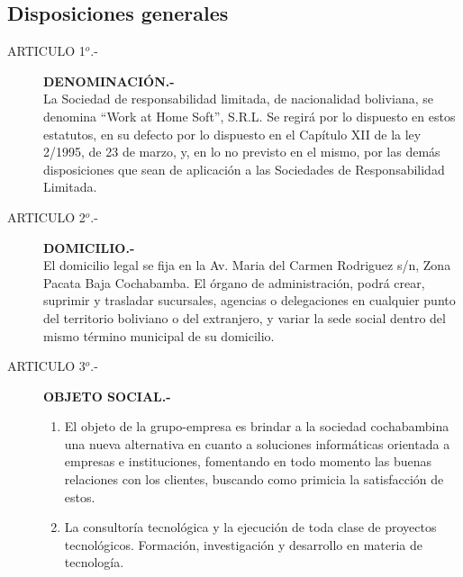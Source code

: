 \documentclass[11pt,letterpaper]{report}
\begin{document}
\subsection{ Disposiciones generales }

\begin{description}
\item[ARTICULO 1$^{o}$.-] {\bf DENOMINACI\'ON.-}\\ La Sociedad de responsabilidad limitada, de nacionalidad boliviana, se denomina “Work at Home Soft”, S.R.L. Se regir\'a por lo dispuesto en estos estatutos, en su defecto por lo dispuesto en el Cap\'itulo XII de la ley 2/1995, de 23 de marzo, y, en lo no previsto en el mismo, por las dem\'as disposiciones que sean de aplicaci\'on a las Sociedades de Responsabilidad Limitada.
\item[ARTICULO 2$^{o}$.-] {\bf DOMICILIO.-}\\ El domicilio legal se fija en la Av. Maria del Carmen Rodriguez s/n, Zona Pacata Baja Cochabamba.
El \'organo de administraci\'on, podr\'a crear, suprimir y trasladar sucursales, agencias o delegaciones en cualquier punto del territorio boliviano o del extranjero, y variar la sede social dentro del mismo t\'ermino municipal de su domicilio.
\item[ARTICULO 3$^{o}$.-] {\bf OBJETO SOCIAL.- }
\begin{enumerate}
\item El objeto de la grupo-empresa es brindar a la sociedad cochabambina una nueva alternativa en cuanto a soluciones inform\'aticas orientada a empresas e instituciones, fomentando en todo momento las buenas relaciones con los clientes, buscando como primicia la satisfacci\'on de estos.
\item La consultor\'ia tecnol\'ogica y la ejecuci\'on de toda clase de proyectos tecnol\'ogicos. Formaci\'on, investigaci\'on y desarrollo en materia de tecnolog\'ia.
\end{enumerate}
\end{description}
\end{document}
